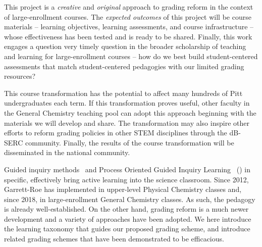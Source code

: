 \documentclass[10pt,letterpaper]{article}
\begin{document}
This project is a \textit{creative} and \textit{original} approach to grading reform in the context of large-enrollment courses.
%
The \textit{expected outcomes} of this project will be course materials -- learning objectives, learning assessments, and course infrastructure -- whose effectiveness has been tested and is ready to be shared. 
%
%
Finally, this work engages a question very timely question in the broader scholarship of teaching and learning for large-enrollment courses -- how do we best build student-centered assessments that match student-centered pedagogies with our limited grading resources? 

This course transformation has the potential to affect many hundreds of Pitt undergraduates each term. If this transformation proves useful, other faculty in the General Chemistry teaching pool can adopt this approach beginning with the materials we will develop and share.  The transformation may also inspire other efforts to reform grading policies in other STEM disciplines through the dB-SERC community. Finally, the results of the course transformation will be disseminated in the national \pogil community.

Guided inquiry methods~\cite{farrellJCE-99,lewisJCE-05,minderhoutBMBE-07,moog-08,eberleinBMBE-08} and Process Oriented Guided Inquiry Learning~\cite{moog-08} (\pogil) in specific, effectively bring active learning into the science classroom. Since 2012, Garrett-Roe has implemented \pogil in upper-level Physical Chemistry classes and, since 2018, in large-enrollment General Chemistry classes.\cite{Vincent-Ruz2020} As such, the \pogil pedagogy is already well-established. On the other hand, grading reform is a much newer development and a variety of approaches have been adopted. We here introduce the learning taxonomy that guides our proposed grading scheme, and introduce related grading schemes that have been demonstrated to be efficacious.
\end{document}

